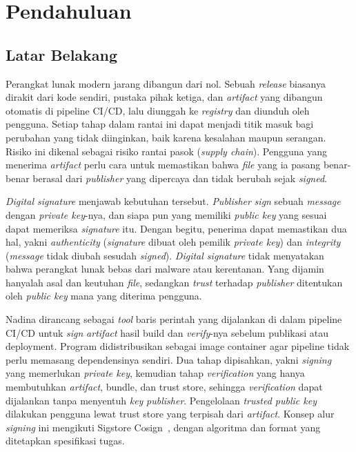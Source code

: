 \section{Pendahuluan}

\subsection{Latar Belakang}
Perangkat lunak modern jarang dibangun dari nol. Sebuah \textit{release} biasanya dirakit dari kode
sendiri, pustaka pihak ketiga, dan \textit{artifact} yang dibangun otomatis di pipeline CI/CD, lalu
diunggah ke \textit{registry} dan diunduh oleh pengguna. Setiap tahap dalam rantai ini dapat menjadi
titik masuk bagi perubahan yang tidak diinginkan, baik karena kesalahan maupun serangan. Risiko
ini dikenal sebagai risiko rantai pasok (\textit{supply chain}). Pengguna yang menerima \textit{artifact}
perlu cara untuk memastikan bahwa \textit{file} yang ia pasang benar-benar berasal dari \textit{publisher} yang
dipercaya dan tidak berubah sejak \textit{signed}.

\textit{Digital signature} menjawab kebutuhan tersebut. \textit{Publisher} \textit{sign} sebuah \textit{message}
dengan \textit{private key}-nya, dan siapa pun yang memiliki \textit{public key} yang sesuai dapat memeriksa
\textit{signature} itu. Dengan begitu, penerima dapat memastikan dua hal, yakni \textit{authenticity} (\textit{signature} dibuat oleh pemilik \textit{private key}) dan \textit{integrity} (\textit{message} tidak diubah sesudah
\textit{signed}). \textit{Digital signature} tidak menyatakan bahwa perangkat lunak bebas dari malware
atau kerentanan. Yang dijamin hanyalah asal dan keutuhan \textit{file}, sedangkan \textit{trust} terhadap
\textit{publisher} ditentukan oleh \textit{public key} mana yang diterima pengguna.

Nadina dirancang sebagai \textit{tool} baris perintah yang dijalankan di dalam pipeline CI/CD untuk
\textit{sign} \textit{artifact} hasil build dan \textit{verify}-nya sebelum publikasi atau deployment.
Program didistribusikan sebagai image container agar pipeline tidak perlu memasang
dependensinya sendiri. Dua tahap dipisahkan, yakni \textit{signing} yang memerlukan
\textit{private key}, kemudian tahap \textit{verification} yang hanya membutuhkan \textit{artifact}, bundle, dan trust store,
sehingga \textit{verification} dapat dijalankan tanpa menyentuh \textit{key} \textit{publisher}. Pengelolaan \textit{trusted public key} 
dilakukan pengguna lewat trust store yang terpisah dari \textit{artifact}. Konsep alur
\textit{signing} ini mengikuti Sigstore Cosign~\cite{cosign}, dengan algoritma dan format yang ditetapkan
spesifikasi tugas.

